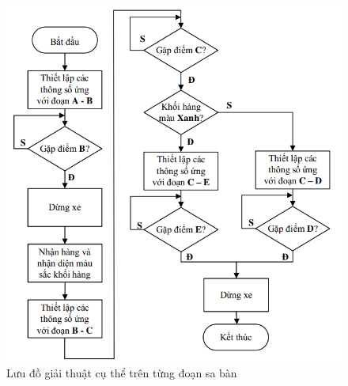                \begin{figure}[H]
                    \centering
                    \includegraphics[width=1\textwidth]{pictures/chapter7/flow2.png}
                    \caption{Lưu đồ giải thuật cụ thể trên từng đoạn sa bàn}
                    \label{flow2}
               \end{figure}




